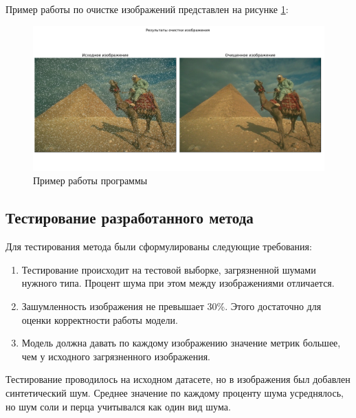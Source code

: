 \newpage
Пример работы по очистке изображений представлен на рисунке \ref{tech::res}:
\FloatBarrier
\begin{figure}[h]	
	\begin{center}
		\includegraphics[width=\linewidth]{inc/png/result2.png}
	\end{center}
	\captionsetup{justification=centering}
	\caption{Пример работы программы}
	\label{tech::res}
\end{figure}
\FloatBarrier

\subsection{Тестирование разработанного метода} 
Для тестирования метода были сформулированы следующие требования:
\begin{enumerate}
	\item Тестирование происходит на тестовой выборке, загрязненной шумами нужного типа.
	Процент шума при этом между изображениями отличается.
	\item Зашумленность изображения не превышает 30\%. Этого достаточно для оценки корректности работы модели.
	\item Модель должна давать по каждому изображению значение метрик большее, чем у исходного загрязненного изображения.
\end{enumerate}

Тестирование проводилось на исходном датасете, но в изображения был добавлен синтетический шум.
Среднее значение по каждому проценту шума усреднялось, но шум соли и перца учитывался как один вид шума.

